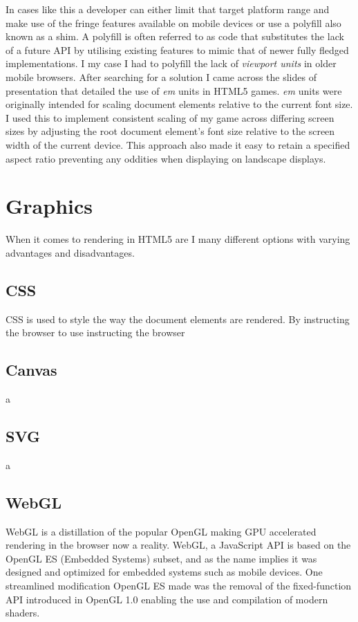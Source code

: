 \documentclass[final]{cmpreport}
\begin{document}
In cases like this a developer can either limit that target platform range and make use of the fringe features available on mobile devices or use a polyfill also known as a shim. A polyfill is often referred to as code that substitutes the lack of a future API by utilising existing features to mimic that of newer fully fledged implementations. \cite{Lawson} I my case I had to polyfill the lack of \textit{viewport units} in older mobile browsers. After searching for a solution I came across the slides of \cite{Kadrmas} presentation that detailed the use of \textit{em} units in HTML5 games. \textit{em} units were originally intended for scaling document elements relative to the current font size. I used this to implement consistent scaling of my game across differing screen sizes by adjusting the root document element's font size relative to the screen width of the current device. This approach also made it easy to retain a specified aspect ratio preventing any oddities when displaying on landscape displays.


\section{Graphics}
When it comes to rendering in HTML5 are I many different options with varying advantages and disadvantages.

\subsection{CSS}
CSS is used to style the way the document elements are rendered. By instructing the browser to use  instructing the browser

\subsection{Canvas}
a

\subsection{SVG}
a

\subsection{WebGL}
WebGL is a distillation of the popular OpenGL making GPU accelerated rendering in the browser now a reality. WebGL, a JavaScript API is based on the OpenGL ES (Embedded Systems) subset, and as the name implies it was designed and optimized for embedded systems such as mobile devices. One streamlined modification OpenGL ES made was the removal of the fixed-function API introduced in OpenGL 1.0 enabling the use and compilation of modern shaders.
\end{document}
